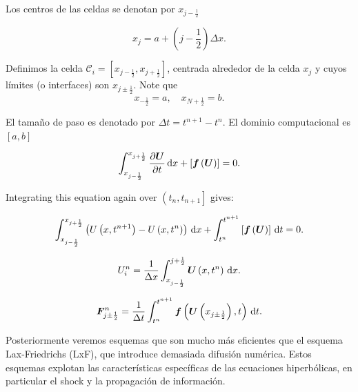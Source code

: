 Los centros de las celdas se denotan por $x_{j-\frac{1}{2}}$

\begin{equation*}
	x_{j}=
	a+
	\left(
	j-
	\frac{1}{2}
	\right)
	\Delta x.
\end{equation*}

Definimos la celda
\begin{math}
	\mathcal{C}_{i}=
	\left[
		x_{j-\frac{1}{2}},
		x_{j+\frac{1}{2}}
		\right]
\end{math},
centrada alrededor de la celda $x_{j}$ y cuyos límites (o interfaces)
son $x_{j\pm\frac{1}{2}}$.
Note que
\begin{equation*}
	x_{-\frac{1}{2}}=
	a,
	\quad
	x_{N+\frac{1}{2}}=
	b.
\end{equation*}

El tamaño de paso es denotado por $\Delta t=t^{n+1}-t^{n}$.
El dominio computacional es $\left[a,b\right]$

\begin{equation*}
	\int_{
		x_{j-\frac{1}{2}}
	}^{
		x_{j+\frac{1}{2}}
	}
	\diffp{\bm{U}}{t}
	\dl x+
	\left[
		\bm{f}
		\left(\bm{U}\right)
		\right]
	=0.
\end{equation*}

Integrating this equation again over
\begin{math}
	\left(
	t_{n},
	t_{n+1}
	\right]
\end{math}
gives:

\begin{equation*}
	\int_{
		x_{j-\frac{1}{2}}
	}^{
		x_{j+\frac{1}{2}}
	}
	\left(
	U
	\left(x,t^{n+1}\right)-
	U
	\left(x,t^{n}\right)
	\right)
	\dl x+
	\int_{t^{n}}^{t^{n+1}}
	\left[
		\bm{f}
		\left(\bm{U}\right)
		\right]
	\dl t=
	0.
\end{equation*}

\begin{equation*}
	U^{n}_{i}=
	\frac{1}{\Delta x}
	\int_{
		x_{j-\frac{1}{2}}
	}^{
		j+\frac{1}{2}
	}
	\bm{U}
	\left(x,t^{n}\right)
	\dl x.
\end{equation*}

\begin{equation*}
	\bm{F}^{n}_{j\pm\frac{1}{2}}=
	\frac{1}{\Delta t}
	\int_{t^{n}}^{t^{n+1}}
	\bm{f}
	\left(\bm{U}\left(x_{j\pm\frac{1}{2}}\right),t\right)
	\dl t.
\end{equation*}

Posteriormente veremos esquemas que son mucho más eficientes que el
esquema Lax-Friedrichs (LxF), que introduce demasiada difusión
numérica.
Estos esquemas explotan las características específicas de las
ecuaciones hiperbólicas, en particular el shock y la propagación de
información.

